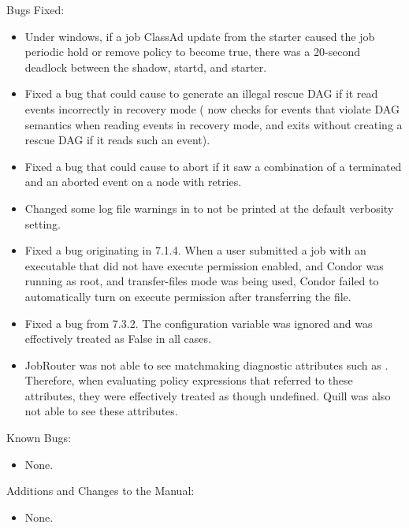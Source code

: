 \noindent Bugs Fixed:

\begin{itemize}

\item Under windows, if a job ClassAd update from the starter caused the
job periodic hold or remove policy to become true, there was a 20-second
deadlock between the shadow, startd, and starter.

\item Fixed a bug that could cause  to generate an
illegal rescue DAG if it read events incorrectly in recovery mode
( now checks for events that violate DAG semantics
when reading events in recovery mode, and exits without creating a
rescue DAG if it reads such an event).

\item Fixed a bug that could cause  to abort if it saw
a combination of a terminated and an aborted event on a node with
retries.

\item Changed some log file warnings in  to not be
printed at the default verbosity setting.

\item Fixed a bug originating in 7.1.4.  When a user submitted a job
with an executable that did not have execute permission enabled, and
Condor was running as root, and transfer-files mode was being used,
Condor failed to automatically turn on execute permission after
transferring the file.

\item Fixed a bug from 7.3.2.  The configuration variable
 was ignored and was effectively
treated as False in all cases.

\item JobRouter was not able to see matchmaking diagnostic attributes
such as .  Therefore, when evaluating policy
expressions that referred to these attributes, they were effectively
treated as though undefined.  Quill was also not able to see these
attributes.

\end{itemize}

\noindent Known Bugs:

\begin{itemize}

\item None.

\end{itemize}

\noindent Additions and Changes to the Manual:

\begin{itemize}

\item None.

\end{itemize}

